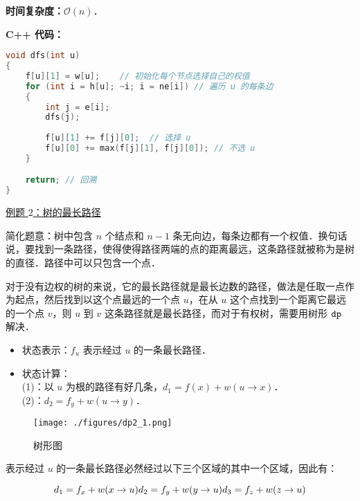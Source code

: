 \textbf{时间复杂度：}$\mathcal{O}(n)$．

\textbf{C++ 代码：}

\begin{lstlisting}[language=cpp]
void dfs(int u)
{
    f[u][1] = w[u];    // 初始化每个节点选择自己的权值
    for (int i = h[u]; ~i; i = ne[i]) // 遍历 u 的每条边
    {
        int j = e[i];
        dfs(j);
        
        f[u][1] += f[j][0];  // 选择 u
        f[u][0] += max(f[j][1], f[j][0]); // 不选 u
    }

    return; // 回溯
}

\end{lstlisting}

\href{https://www.luogu.com.cn/problem/SP1437}{例题 $2$：树的最长路径}

简化题意：树中包含 $n$ 个结点和 $n-1$ 条无向边，每条边都有一个权值．换句话说，要找到一条路径，使得使得路径两端的点的距离最远，这条路径就被称为是树的直径．路径中可以只包含一个点．

对于没有边权的树的来说，它的最长路径就是最长边数的路径，做法是任取一点作为起点，然后找到以这个点最远的一个点 $u$，在从 $u$ 这个点找到一个距离它最远的一个点 $v$，则 $u$ 到 $v$ 这条路径就是最长路径，而对于有权树，需要用树形 $\tt dp$ 解决．

\begin{itemize}
\item 状态表示：$f_u$ 表示经过 $u$ 的一条最长路径．
\end{itemize}

\begin{itemize}
\item 状态计算： \\
    (1)：以 $u$ 为根的路径有好几条，$d_1 = f(x) + w(u \to x)$． \\
    (2)：$d_2 = f_y + w(u \to y)$．
\end{itemize}

\begin{figure}[ht]
\centering
\texttt{[image: ./figures/dp2\_1.png]}
\caption{树形图} \label{dp2_fig1}
\end{figure}

表示经过 $u$ 的一条最长路径必然经过以下三个区域的其中一个区域，因此有：

\begin{equation}
d_1 = f_x + w(x \to u) \\
d_2 = f_y + w(y \to u) \\
d_3 = f_z + w(z \to u) \\
\end{equation}

